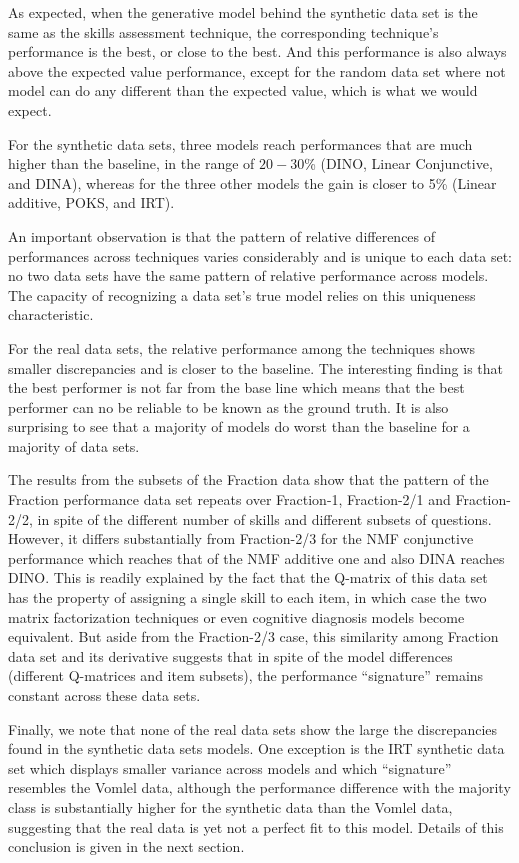 As expected, when the generative model behind the synthetic data set is the same as the skills assessment technique, the corresponding technique's performance is the best, or close to the best.  And this performance is also always above the expected value performance, except for the random data set where not model can do any different than the expected value, which is what we would expect.

For the synthetic data sets, three models reach performances that are much higher than the baseline, in the range of $20-30$\% (DINO, Linear Conjunctive, and DINA), whereas for the three other models the gain is closer to 5\% (Linear additive, POKS, and IRT).

An important observation is that the pattern of relative differences of performances across techniques varies considerably and is unique to each data set: no two data sets have the same pattern of relative performance across models.  The capacity of recognizing a data set's true model relies on this uniqueness characteristic.

For the real data sets, the relative performance among the techniques shows smaller discrepancies and is closer to the baseline. The interesting finding is that the best performer is not far from the base line which means that the best performer can no be reliable to be known as the ground truth. It is also surprising to see that a majority of models do worst than the baseline for a majority of data sets. 

The results from the subsets of the Fraction data show that the pattern of the Fraction performance data set repeats over Fraction-1, Fraction-2/1 and Fraction-2/2, in spite of the different number of skills and different subsets of questions.  However, it differs substantially from Fraction-2/3 for the NMF conjunctive performance which reaches that of the NMF additive one and also DINA reaches DINO. This is readily explained by the fact that the Q-matrix of this data set has the property of assigning a single skill to each item, in which case the two matrix factorization techniques or even cognitive diagnosis models become equivalent.  But aside from the Fraction-2/3 case, this similarity among Fraction data set and its derivative suggests that in spite of the model differences (different Q-matrices and item subsets), the performance ``signature'' remains constant across these data sets.

Finally, we note that none of the real data sets show the large the discrepancies found in the synthetic data sets models. One exception is the IRT synthetic data set which displays smaller variance across models and which ``signature'' resembles the Vomlel data, although the performance difference with the majority class is substantially higher for the synthetic data than the Vomlel data, suggesting that the real data is yet not a perfect fit to this model. Details of this conclusion is given in the next section.



